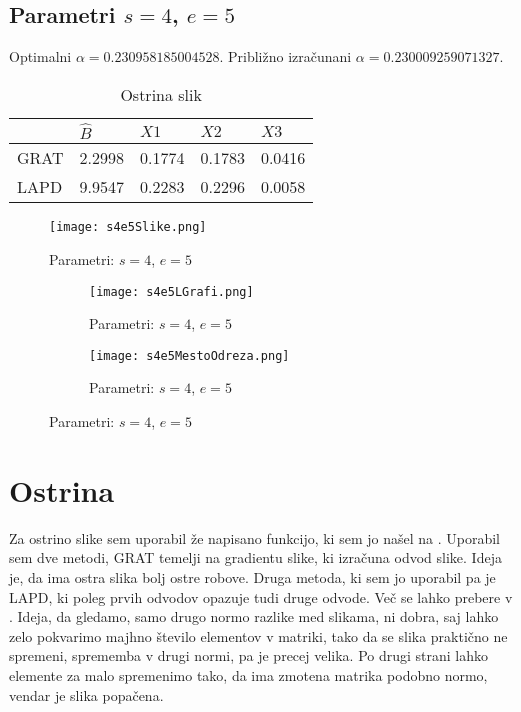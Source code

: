 \documentclass[a4paper,12pt]{article}
\begin{document}
\newpage
\subsection{Parametri $s=4$, $e=5$}
Optimalni $\alpha =0.230958185004528$.
Približno izračunani $\alpha = 0.230009259071327.$ 
\begin{table}[h!]
	\centering
\caption{Ostrina slik}
	\begin{tabular}{|l|l|l|l|l|}
		\hline
		& $\widehat{B}$ & $X1$   & $X2$   & $X3$   \\ \hline
		GRAT & 2.2998        & 0.1774 & 0.1783 & 0.0416 \\ \hline
		LAPD & 9.9547        & 0.2283 & 0.2296 & 0.0058 \\ \hline
	\end{tabular}
\end{table}


\begin{figure}[h!]
	\texttt{[image: s4e5Slike.png]}
	\centering
	\caption{Parametri: $s = 4$, $e = 5$}
	\label{fig:s4e5Slike}
\end{figure}
\begin{figure}[h!]
\begin{subfigure}{.5\textwidth}
	\texttt{[image: s4e5LGrafi.png]}
	\centering
	\caption{Parametri: $s = 4$, $e = 5$}
	\label{fig:s4e5LGrafi}
\end{subfigure}
\begin{subfigure}{.5\textwidth}
	\texttt{[image: s4e5MestoOdreza.png]}
	\centering
	\caption{Parametri: $s = 4$, $e = 5$}
	\label{fig:s4e5MestoOdreza}	
\end{subfigure}

	
\end{figure}
\newpage



\section{Ostrina}
Za ostrino slike sem uporabil že napisano funkcijo, ki sem jo našel na \cite{vir1}. Uporabil sem dve metodi, GRAT temelji na gradientu slike, ki izračuna odvod slike. Ideja je, da ima ostra slika bolj ostre robove. Druga metoda, ki sem jo uporabil pa je LAPD, ki poleg prvih odvodov opazuje tudi druge odvode. Več se lahko prebere v \cite{vir2}. Ideja, da gledamo, samo drugo normo razlike med slikama, ni dobra, saj lahko zelo pokvarimo majhno število elementov v matriki, tako da se slika praktično ne spremeni, sprememba v drugi normi, pa je precej velika. Po drugi strani lahko elemente za malo spremenimo tako, da ima zmotena matrika podobno normo, vendar je slika popačena.  
\end{document}
